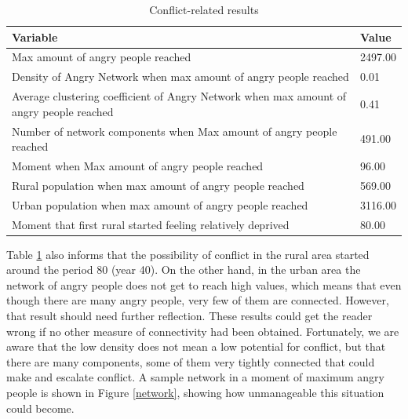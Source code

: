 \documentclass[doc,12pt,floatsintext]{apa7}
\begin{document}
\begin{table}[ht]
\renewcommand{\arraystretch}{1.5}
  \caption{Conflict-related results}

{\scriptsize
\begin{tabular}{m{5in}p{0.5in}}
  \hline
Variable & Value \\
  \hline
Max amount of angry people reached & 2497.00\\
  Density of Angry Network when max amount of angry people reached & 0.01\\
  Average clustering coefficient of Angry Network when max amount of angry people reached & 0.41 \\
  Number of network components when Max amount of angry people reached & 491.00 \\
  Moment when Max amount of angry people reached & 96.00 \\
  Rural population when max amount of angry people reached & 569.00 \\
  Urban population when max amount of angry people reached & 3116.00 \\
  Moment that first rural started feeling relatively deprived & 80.00 \\
   \hline
\end{tabular}
}
\label{conflict-out}
\end{table}



Table \ref{conflict-out} also informs that the possibility of conflict in the rural area started around the period 80 (year 40). On the other hand, in the urban area the network of angry people does not get to reach high values, which means that even though there are many angry people, very few of them are connected. However, that result should need further reflection. These results could get the reader wrong if no other measure of connectivity had been obtained. Fortunately, we are aware that the low density does not mean a low potential for conflict, but that there are many components, some of them very tightly connected that could make and escalate conflict. A sample network in a moment of maximum angry people is shown in Figure \ref{network}, showing how unmanageable this situation could become.
\end{document}
